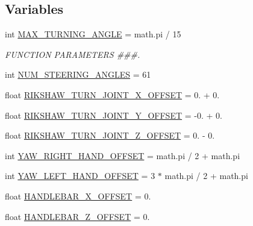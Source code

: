\subsection*{Variables}
\begin{DoxyCompactItemize}
\item 
int \mbox{\hyperlink{namespacesteering__capture__trajectory_a6155b891225d6159102998a90477e8bd}{M\+A\+X\+\_\+\+T\+U\+R\+N\+I\+N\+G\+\_\+\+A\+N\+G\+LE}} = math.\+pi / 15
\begin{DoxyCompactList}\small\item\em F\+U\+N\+C\+T\+I\+ON P\+A\+R\+A\+M\+E\+T\+E\+RS \#\#\#. \end{DoxyCompactList}\item 
int \mbox{\hyperlink{namespacesteering__capture__trajectory_a502582b5696e4be28448834e0fe99046}{N\+U\+M\+\_\+\+S\+T\+E\+E\+R\+I\+N\+G\+\_\+\+A\+N\+G\+L\+ES}} = 61
\item 
float \mbox{\hyperlink{namespacesteering__capture__trajectory_ac090b981cb214d176f25fa58944b2ed2}{R\+I\+K\+S\+H\+A\+W\+\_\+\+T\+U\+R\+N\+\_\+\+J\+O\+I\+N\+T\+\_\+\+X\+\_\+\+O\+F\+F\+S\+ET}} = 0. + 0.
\item 
float \mbox{\hyperlink{namespacesteering__capture__trajectory_a22143181effe532995b5b603cd7c2d1d}{R\+I\+K\+S\+H\+A\+W\+\_\+\+T\+U\+R\+N\+\_\+\+J\+O\+I\+N\+T\+\_\+\+Y\+\_\+\+O\+F\+F\+S\+ET}} = -\/0. + 0.
\item 
float \mbox{\hyperlink{namespacesteering__capture__trajectory_a4d3fdced7d3b76c75114bb648d3a1975}{R\+I\+K\+S\+H\+A\+W\+\_\+\+T\+U\+R\+N\+\_\+\+J\+O\+I\+N\+T\+\_\+\+Z\+\_\+\+O\+F\+F\+S\+ET}} = 0. -\/ 0.
\item 
int \mbox{\hyperlink{namespacesteering__capture__trajectory_a027ded4eedbe123d70c340e8d8efbd54}{Y\+A\+W\+\_\+\+R\+I\+G\+H\+T\+\_\+\+H\+A\+N\+D\+\_\+\+O\+F\+F\+S\+ET}} = math.\+pi / 2 + math.\+pi
\item 
int \mbox{\hyperlink{namespacesteering__capture__trajectory_abafd6fa1793072a5d8078e7cca0d4cca}{Y\+A\+W\+\_\+\+L\+E\+F\+T\+\_\+\+H\+A\+N\+D\+\_\+\+O\+F\+F\+S\+ET}} = 3 $\ast$ math.\+pi / 2 + math.\+pi
\item 
float \mbox{\hyperlink{namespacesteering__capture__trajectory_a091d8b84e39b03a994b188df501802bb}{H\+A\+N\+D\+L\+E\+B\+A\+R\+\_\+\+X\+\_\+\+O\+F\+F\+S\+ET}} = 0.
\item 
float \mbox{\hyperlink{namespacesteering__capture__trajectory_a6c82437a14ebdbb1aba827dfb46ddb7f}{H\+A\+N\+D\+L\+E\+B\+A\+R\+\_\+\+Z\+\_\+\+O\+F\+F\+S\+ET}} = 0.

\end{DoxyCompactItemize}
